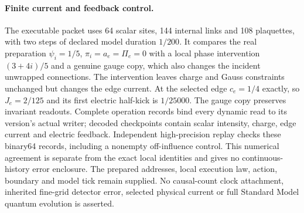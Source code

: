 \paragraph{Finite current and feedback control.}
The executable packet uses 64 scalar sites, 144 internal links and 108
plaquettes, with two steps of declared model duration $1/200$. It compares
the real preparation $\psi_i=1/5$, $\pi_i=a_e=\Pi_e=0$ with a local
phase intervention $(3+4i)/5$ and a genuine gauge copy, which also changes
the incident unwrapped connections. The intervention leaves charge and
Gauss constraints unchanged but changes the edge current. At the selected
edge $c_e=1/4$ exactly, so $J_e=2/125$ and its first electric half-kick is
$1/25000$. The gauge copy preserves invariant readouts. Complete operation
records bind every dynamic read to its version's actual writer; decoded
checkpoints contain scalar intensity, charge, edge current and electric
feedback. Independent high-precision replay checks these binary64 records,
including a nonempty off-influence control. This numerical agreement is
separate from the exact local identities and gives no continuous-history
error enclosure. The prepared addresses, local execution law, action,
boundary and model tick remain supplied. No causal-count clock attachment,
inherited fine-grid detector error, selected physical current or full
Standard Model quantum evolution is asserted.
